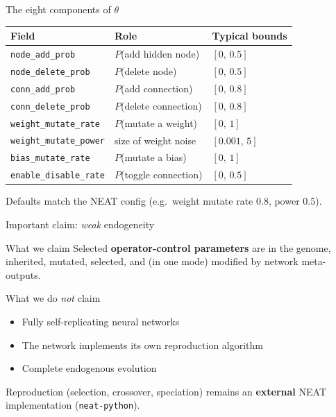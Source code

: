 \documentclass[aspectratio=169,11pt]{beamer}
\begin{document}
\begin{frame}{The eight components of $\theta$}
  \begin{tabular}{lll}
    \toprule
    Field & Role & Typical bounds \\
    \midrule
    \texttt{node\_add\_prob} & $P$(add hidden node) & $[0,\,0.5]$ \\
    \texttt{node\_delete\_prob} & $P$(delete node) & $[0,\,0.5]$ \\
    \texttt{conn\_add\_prob} & $P$(add connection) & $[0,\,0.8]$ \\
    \texttt{conn\_delete\_prob} & $P$(delete connection) & $[0,\,0.8]$ \\
    \texttt{weight\_mutate\_rate} & $P$(mutate a weight) & $[0,\,1]$ \\
    \texttt{weight\_mutate\_power} & size of weight noise & $[0.001,\,5]$ \\
    \texttt{bias\_mutate\_rate} & $P$(mutate a bias) & $[0,\,1]$ \\
    \texttt{enable\_disable\_rate} & $P$(toggle connection) & $[0,\,0.5]$ \\
    \bottomrule
  \end{tabular}

  \vspace{0.8em}
  Defaults match the NEAT config (e.g.\ weight mutate rate $0.8$, power $0.5$).
\end{frame}

\begin{frame}{Important claim: \emph{weak} endogeneity}
  \begin{alertblock}{What we claim}
    Selected \textbf{operator-control parameters} are in the genome, inherited, mutated,
    selected, and (in one mode) modified by network meta-outputs.
  \end{alertblock}

  \begin{block}{What we do \emph{not} claim}
    \begin{itemize}
      \item Fully self-replicating neural networks
      \item The network implements its own reproduction algorithm
      \item Complete endogenous evolution
    \end{itemize}
  \end{block}

  Reproduction (selection, crossover, speciation) remains an \textbf{external}
  NEAT implementation (\texttt{neat-python}).
\end{frame}
\end{document}
